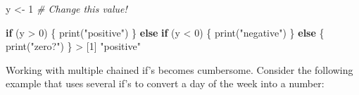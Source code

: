 \documentclass[
]{book}
\newenvironment{Shaded}{\begin{snugshade}}{\end{snugshade}}
\newcommand{\CommentTok}[1]{\textcolor[rgb]{0.56,0.35,0.01}{\textit{#1}}}
\newcommand{\ControlFlowTok}[1]{\textcolor[rgb]{0.13,0.29,0.53}{\textbf{#1}}}
\newcommand{\DecValTok}[1]{\textcolor[rgb]{0.00,0.00,0.81}{#1}}
\newcommand{\FunctionTok}[1]{\textcolor[rgb]{0.00,0.00,0.00}{#1}}
\newcommand{\NormalTok}[1]{#1}
\newcommand{\OtherTok}[1]{\textcolor[rgb]{0.56,0.35,0.01}{#1}}
\newcommand{\SpecialCharTok}[1]{\textcolor[rgb]{0.00,0.00,0.00}{#1}}
\newcommand{\StringTok}[1]{\textcolor[rgb]{0.31,0.60,0.02}{#1}}
\begin{document}
\begin{Shaded}
\begin{Highlighting}[]
\NormalTok{y }\OtherTok{\textless{}{-}} \DecValTok{1} \CommentTok{\# Change this value!}

\ControlFlowTok{if}\NormalTok{ (y }\SpecialCharTok{\textgreater{}} \DecValTok{0}\NormalTok{) \{}
  \FunctionTok{print}\NormalTok{(}\StringTok{"positive"}\NormalTok{)}
\NormalTok{\} }\ControlFlowTok{else} \ControlFlowTok{if}\NormalTok{ (y }\SpecialCharTok{\textless{}} \DecValTok{0}\NormalTok{) \{}
  \FunctionTok{print}\NormalTok{(}\StringTok{"negative"}\NormalTok{)}
\NormalTok{\} }\ControlFlowTok{else}\NormalTok{ \{}
  \FunctionTok{print}\NormalTok{(}\StringTok{"zero?"}\NormalTok{)}
\NormalTok{\}}
\SpecialCharTok{\textgreater{}}\NormalTok{ [}\DecValTok{1}\NormalTok{] }\StringTok{"positive"}
\end{Highlighting}
\end{Shaded}

Working with multiple chained if's becomes cumbersome. Consider the following
example that uses several if's to convert a day of the week into a number:
\end{document}
